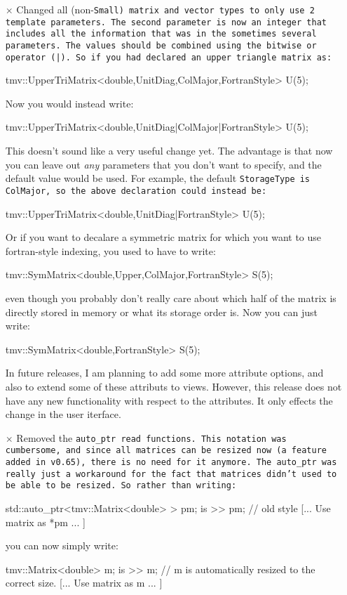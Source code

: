 \begin{itemize}
\item[$\times$]
Changed all (non-\tt{Small}) matrix and vector types to only use 2 template
parameters.  The second parameter is now an integer that includes all
the information that was in the sometimes several parameters.  The 
values should be combined using the bitwise or operator (\tt{|}).  
So if you had declared an upper triangle matrix as:
\begin{tmvcode}
tmv::UpperTriMatrix<double,UnitDiag,ColMajor,FortranStyle> U(5);
\end{tmvcode}
Now you would instead write:
\begin{tmvcode}
tmv::UpperTriMatrix<double,UnitDiag|ColMajor|FortranStyle> U(5);
\end{tmvcode}
This doesn't sound like a very useful change yet.  The advantage is that
now you can leave out {\em any} parameters that you don't want to specify,
and the default value would be used.  For example, the default 
\tt{StorageType} is \tt{ColMajor}, so the above declaration could instead be:
\begin{tmvcode}
tmv::UpperTriMatrix<double,UnitDiag|FortranStyle> U(5);
\end{tmvcode}
Or if you want to decalare a symmetric matrix for which you want to
use fortran-style indexing, you used to have to write:
\begin{tmvcode}
tmv::SymMatrix<double,Upper,ColMajor,FortranStyle> S(5);
\end{tmvcode}
even though you probably don't really care about which half of the 
matrix is directly stored in memory or what its storage order is.
Now you can just write:
\begin{tmvcode}
tmv::SymMatrix<double,FortranStyle> S(5);
\end{tmvcode}
In future releases, I am planning to add some more attribute options,
and also to extend some of these attributs to views.  However,
this release does not have any new functionality with respect to the
attributes.  It only effects the change in the user iterface.
 
\item[$\times$]
Removed the \tt{auto_ptr} read functions.  This notation was cumbersome, and since 
all matrices can be resized now (a feature added in v0.65), there is no need for it anymore.
The \tt{auto_ptr} was really just a workaround for the fact that matrices didn't used to be 
able to be resized.  So rather than writing:
\begin{tmvcode}
std::auto_ptr<tmv::Matrix<double> > pm;
is >> pm;  // old style
[... Use matrix as *pm ... ]
\end{tmvcode}
you can now simply write:
\begin{tmvcode}
tmv::Matrix<double> m;
is >> m;   // m is automatically resized to the correct size.
[... Use matrix as m ... ]
\end{tmvcode}


\end{itemize}
